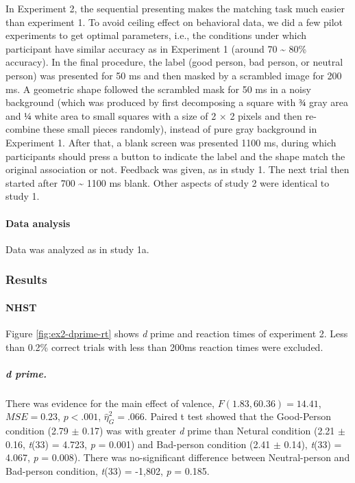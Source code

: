 \documentclass[
  english,
  man]{apa6}
\let\oldparagraph\paragraph
\renewcommand{\paragraph}[1]{\oldparagraph{#1}\mbox{}}
\let\oldsubparagraph\subparagraph
\renewcommand{\subparagraph}[1]{\oldsubparagraph{#1}\mbox{}}
\begin{document}
In Experiment 2, the sequential presenting makes the matching task much easier than experiment 1. To avoid ceiling effect on behavioral data, we did a few pilot experiments to get optimal parameters, i.e., the conditions under which participant have similar accuracy as in Experiment 1 (around 70 \textasciitilde{} 80\% accuracy).
In the final procedure, the label (good person, bad person, or neutral person) was presented for 50 ms and then masked by a scrambled image for 200 ms. A geometric shape followed the scrambled mask for 50 ms in a noisy background (which was produced by first decomposing a square with \(¾\) gray area and \(¼\) white area to small squares with a size of 2 × 2 pixels and then re-combine these small pieces randomly), instead of pure gray background in Experiment 1. After that, a blank screen was presented 1100 ms, during which participants should press a button to indicate the label and the shape match the original association or not. Feedback was given, as in study 1. The next trial then started after 700 \textasciitilde{} 1100 ms blank. Other aspects of study 2 were identical to study 1.

\hypertarget{data-analysis-4}{%
\paragraph{Data analysis}\label{data-analysis-4}}

Data was analyzed as in study 1a.

\hypertarget{results-3}{%
\subsubsection{Results}\label{results-3}}

\hypertarget{nhst-1}{%
\paragraph{NHST}\label{nhst-1}}

Figure \ref{fig:ex2-dprime-rt} shows \emph{d} prime and reaction times of experiment 2. Less than 0.2\% correct trials with less than 200ms reaction times were excluded.

\hypertarget{d-prime.}{%
\subparagraph{d prime.}\label{d-prime.}}

There was evidence for the main effect of valence, \(F(1.83, 60.36) = 14.41\), \(\mathit{MSE} = 0.23\), \(p < .001\), \(\hat{\eta}^2_G = .066\). Paired t test showed that the Good-Person condition (2.79 \(\pm\) 0.17) was with greater \emph{d} prime than Netural condition (2.21 \(\pm\) 0.16, \emph{t}(33) = 4.723, \emph{p} = 0.001) and Bad-person condition (2.41 \(\pm\) 0.14), \emph{t}(33) = 4.067, \emph{p} = 0.008). There was no-significant difference between Neutral-person and Bad-person condition, \emph{t}(33) = -1,802, \emph{p} = 0.185.
\end{document}
